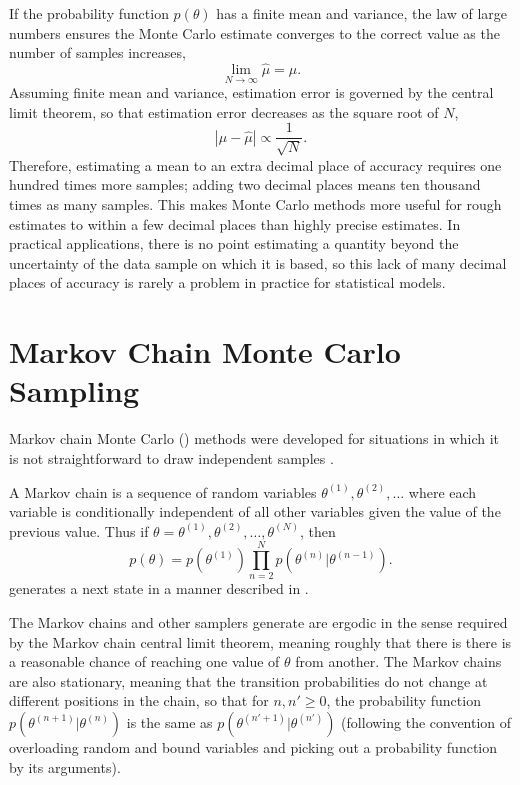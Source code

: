 If the probability function $p(\theta)$ has a finite mean and
variance, the law of large numbers ensures the Monte Carlo estimate
converges to the correct value as the number of samples increases,
\[
\lim_{N \rightarrow \infty} \hat{\mu} = \mu.
\]
Assuming finite mean and variance, estimation error is governed by the
central limit theorem, so that estimation error decreases as the
square root of $N$,
\[
|\mu - \hat{\mu}| \propto \frac{1}{\sqrt{N}}.
\]
Therefore, estimating a mean to an extra decimal place of accuracy
requires one hundred times more samples; adding two decimal places
means ten thousand times as many samples.  This makes Monte Carlo
methods more useful for rough estimates to within a few decimal places
than highly precise estimates.  In practical applications, there is no
point estimating a quantity beyond the uncertainty of the data sample
on which it is based, so this lack of many decimal places of accuracy
is rarely a problem in practice for statistical models.


\section{Markov Chain Monte Carlo Sampling}

Markov chain Monte Carlo (\MCMC) methods were developed for situations
in which it is not straightforward to draw independent samples
\citep{Metropolis:1953}.

A Markov chain is a sequence of random variables $\theta^{(1)},
\theta^{(2)},\ldots$ where each variable is conditionally independent
of all other variables given the value of the previous value.  Thus if
$\theta = \theta^{(1)}, \theta^{(2)},\ldots, \theta^{(N)}$, then
\[
p(\theta) = p(\theta^{(1)}) \prod_{n=2}^N p(\theta^{(n)}|\theta^{(n-1)}).
\]
\Stan generates a next state in a manner described in
. 

The Markov chains \Stan and other \MCMC samplers generate are ergodic
in the sense required by the Markov chain central limit theorem,
meaning roughly that there is there is a reasonable chance of reaching
one value of $\theta$ from another.  The Markov chains are also
stationary, meaning that the transition probabilities do not change at
different positions in the chain, so that for $n, n' \geq 0$, the
probability function $p(\theta^{(n+1)}|\theta^{(n)})$ is the same as
$p(\theta^{(n'+1)}|\theta^{(n')})$ (following the convention of
overloading random and bound variables and picking out a probability
function by its arguments).

